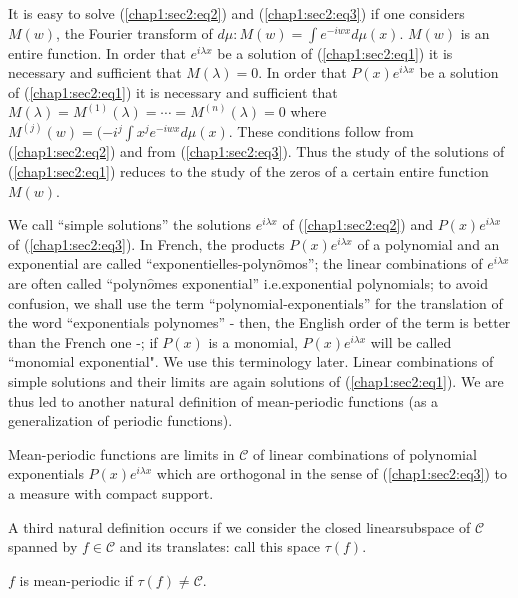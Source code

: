 It is easy to solve (\ref{chap1:sec2:eq2}) and (\ref{chap1:sec2:eq3}) if one considers $M(w)$, the
Fourier transform of $d \mu : M (w) = \int e^{-i wx} d \mu (x)$. $M(w)$
is an entire function. In order that $e^{i \lambda x}$ be a solution
of (\ref{chap1:sec2:eq1}) it is necessary and sufficient that $M (\lambda) =0$. In order
that $P (x) e^{i \lambda x}$ be a
solution of (\ref{chap1:sec2:eq1}) it is necessary and sufficient that $M(\lambda) =
M^{(1)} (\lambda) = \cdots = M^{(n)} (\lambda) = 0$ where $M^{(j)} (w)
= (-i^j \int x^j e^{-iwx} d \mu (x)$. These conditions follow from
(\ref{chap1:sec2:eq2}) and from (\ref{chap1:sec2:eq3}). Thus the study
of the solutions of (\ref{chap1:sec2:eq1}) reduces 
to the study of the zeros of a certain entire function $M(w)$. 

We call ``simple solutions'' the solutions $e^{i \lambda x}$ of
(\ref{chap1:sec2:eq2})
and $P(x) e^{i \lambda x}$ of (\ref{chap1:sec2:eq3}). In French, the products $P (x)
e^{i \lambda x}$ of a polynomial and an exponential are called
``exponentielles-polyn$\hat{o}$mos''; the linear combinations of $e^{i 
 \lambda x}$ are often called ``polyn$\hat{o}$mes exponential''
i.e.\pageoriginale exponential polynomials; to avoid confusion, we shall use the
term ``polynomial-exponentials'' for the translation of the word
``exponentials polynomes'' - then, the English order of the term is
better than the French one -; if $P (x)$ is a monomial, $P(x) e^{i
 \lambda x}$ will be called ``monomial exponential". We use this
terminology later. Linear combinations of simple solutions and their
limits are again solutions of (\ref{chap1:sec2:eq1}). We are thus led to another
natural definition of mean-periodic functions (as a generalization of
periodic functions). 

\begin{defi}\label{chap1:sec2:def2}%
 Mean-periodic functions are limits in $\mathscr{C}$ of linear
 combinations of polynomial exponentials $P(x) e^{i \lambda x}$ which
 are orthogonal in the sense of (\ref{chap1:sec2:eq3}) to a measure with compact
 support.
\end{defi}

A third natural definition occurs if we consider the closed
linearsubspace of $\mathscr{C}$ spanned by $ f \in \mathscr{C}$ and
its translates: call this space $\tau (f)$. 

\begin{defi}\label{chap1:sec2:def3}%
 $f$ is mean-periodic if $ \tau (f) \neq \mathscr{C}$. 
\end{defi}

